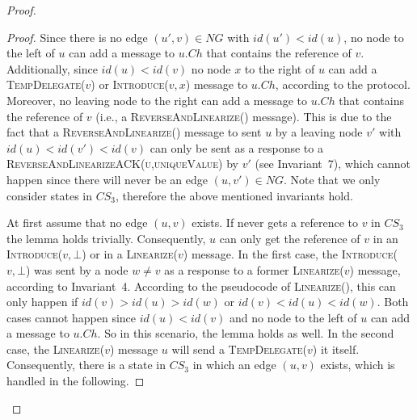 \documentclass[a4paper,USenglish]{lipics}
\newcommand{\linearize}[1]{\textsc{Linearize(\ensuremath{#1})}\xspace}
\newcommand{\introduce}[1]{\textsc{Introduce(\ensuremath{#1})}\xspace}
\newcommand{\tempdelegate}[1]{\textsc{TempDelegate(\ensuremath{#1})}\xspace}
\newcommand{\revandlin}[1]{\textsc{ReverseAndLinearize(\ensuremath{#1})}\xspace} \newcommand{\revandlinREQ}[1]{\textsc{ReverseAndLinearizeREQ(#1)}\xspace}
\newcommand{\revandlinACK}[1]{\textsc{ReverseAndLinearizeACK(#1)}\xspace}
\begin{document}
\begin{proof}
\begin{proof}
Since there is no edge $(u',v) \in NG$ with $id(u')<id(u)$, no node to the left of $u$ can add a message to $u.Ch$ that contains the reference of $v$.
Additionally, since $id(u)<id(v)$ no node $x$ to the right of $u$ can add a \tempdelegate{v} or \introduce{v,x} message to $u.Ch$, according to the protocol.
Moreover, no leaving node to the right can add a message to $u.Ch$ that contains the reference of $v$ (i.e., a \revandlin{} message).
This is due to the fact that a \revandlin{} message to sent $u$ by a leaving node $v'$ with $id(u)<id(v')<id(v)$ can only be sent as a response to a \revandlinACK{u,uniqueValue} by $v'$ (see Invariant~7), which cannot happen since there will never be an edge $(u,v') \in NG$.
Note that we only consider states in $CS_3$, therefore the above mentioned invariants hold.

At first assume that no edge $(u,v)$ exists.
If never gets a reference to $v$ in $CS_3$ the lemma holds trivially.
Consequently, $u$ can only get the reference of $v$ in an \introduce{v,\bot} or in a \linearize{v}  message.
In the first case, the \introduce{v,\bot} was sent by a node $w\neq v$ as a response to a former \linearize{v} message, according to Invariant~4.
According to the pseudocode of \linearize{}, this can only happen if $id(v)>id(u)>id(w)$ or $id(v)<id(u)<id(w)$.
Both cases cannot happen since $id(u)<id(v)$ and no node to the left of $u$ can add a message to $u.Ch$.
So in this scenario, the lemma holds as well.
In the second case, the \linearize{v} message $u$ will send a \tempdelegate{v} it itself.
Consequently, there is a state in $CS_3$ in which an edge $(u,v)$ exists, which is handled in the following.


\end{proof}
\end{proof}
\end{document}
